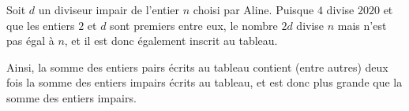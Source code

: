 Soit $d$ un diviseur impair de l'entier $n$ choisi par Aline. Puisque $4$ divise $2020$ et que les entiers $2$ et $d$ sont premiers entre eux, le nombre $2d$ divise $n$ mais n'est pas égal à $n$, et il est donc également inscrit au tableau.

Ainsi, la somme des entiers pairs écrits au tableau contient (entre autres) deux fois la somme des entiers impairs écrits au tableau, et est donc plus grande que la somme des entiers impairs.